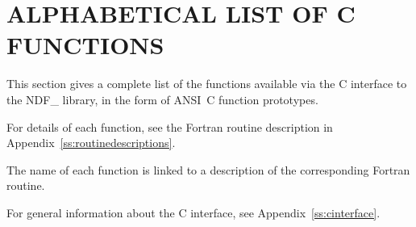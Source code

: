 \section{\label{ss:alphalistofcfunctions}ALPHABETICAL LIST OF C FUNCTIONS}

This section gives a complete list of the functions available via the
C interface to the NDF\_ library, in the form of ANSI~C function
prototypes.
\begin{latexonly}For details of each function, see the Fortran routine
description in Appendix~\ref{ss:routinedescriptions}.
\end{latexonly}
\begin{htmlonly}
The name of each function is linked to a description of the
corresponding Fortran routine.
\end{htmlonly}
For general information about the C interface, see
Appendix~\ref{ss:cinterface}.\\[1.0ex]

